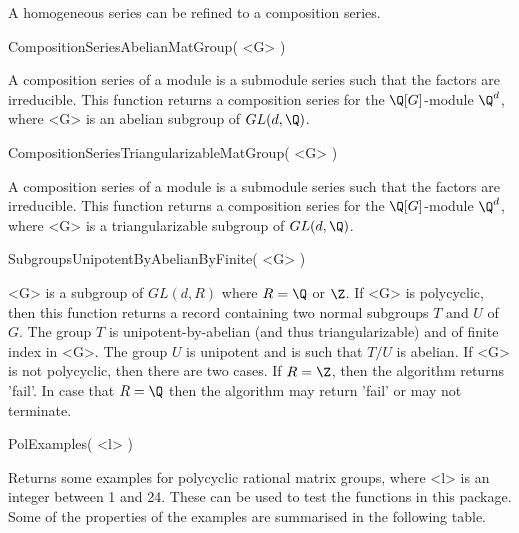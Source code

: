 A homogeneous series can be refined to a composition series.

\> CompositionSeriesAbelianMatGroup( <G> )

A composition series of a module is a submodule series such that 
the factors are irreducible. This function returns a 
composition series for the $\Q[G]$-module $\Q^d$, where <G> is an
abelian subgroup of $GL(d,\Q)$.

\> CompositionSeriesTriangularizableMatGroup( <G> )

A composition series of a module is a submodule series such that 
the factors are irreducible. This function returns a 
composition series for the $\Q[G]$-module $\Q^d$, where <G> is a
triangularizable subgroup of $GL(d,\Q)$.


%

\> SubgroupsUnipotentByAbelianByFinite( <G> )

<G> is  a subgroup of $GL(d,R)$ where $R=\Q$ or $\Z$.
If <G> is polycyclic, then 
this function returns a record containing two normal subgroups 
$T$ and $U$ of $G$.
The group $T$ is unipotent-by-abelian 
(and thus triangularizable) and 
of finite index in <G>. 
The group $U$ is unipotent and is such that $T/U$ is abelian.  
If <G> is not polycyclic, then there are two cases. If $R=\Z$,
then the algorithm returns 'fail'. In case that $R=\Q$ then the algorithm may
return 'fail' or may not terminate.  


\> PolExamples( <l> )
 
Returns some examples for polycyclic rational matrix groups, where <l> 
is an integer
between 1 and 24. 
These can be used to test the functions in this package. 
Some of the
properties of the examples are summarised in the following table.

